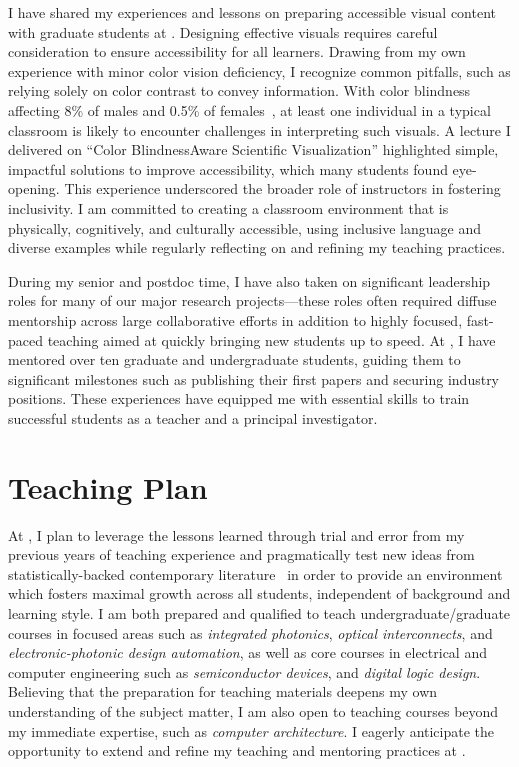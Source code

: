 I have shared my experiences and lessons on preparing accessible visual content with graduate students at \mySchoolShort{}. Designing effective visuals requires careful consideration to ensure accessibility for all learners. Drawing from my own experience with minor color vision deficiency, I recognize common pitfalls, such as relying solely on color contrast to convey information. With color blindness affecting 8\% of males and 0.5\% of females~\cite{TypesColourBlindness}, at least one individual in a typical classroom is likely to encounter challenges in interpreting such visuals. A lecture I delivered on “Color Blindness\textendash{}Aware Scientific Visualization” highlighted simple, impactful solutions to improve accessibility, which many students found eye-opening. This experience underscored the broader role of instructors in fostering inclusivity. I am committed to creating a classroom environment that is physically, cognitively, and culturally accessible, using inclusive language and diverse examples while regularly reflecting on and refining my teaching practices.

During my senior \myDegree{} and postdoc time, I have also taken on significant leadership roles for many of our major research projects—these roles often required diffuse mentorship across large collaborative efforts in addition to highly focused, fast-paced teaching aimed at quickly bringing new students up to speed. At \mySchoolShort{}, I have mentored over ten graduate and undergraduate students, guiding them to significant milestones such as publishing their first papers and securing industry positions. These experiences have equipped me with essential skills to train successful students as a teacher and a principal investigator.

\section*{Teaching Plan}

At \appSchoolShort{}, I plan to leverage the lessons learned through trial and error from my previous years of teaching experience and pragmatically test new ideas from statistically-backed contemporary literature~\cite{deslauriersMeasuringActualLearning2019,bathgatePerceivedSupportsEvidencebased2019} in order to provide an environment which fosters maximal growth across all students, independent of background and learning style. I am both prepared and qualified to teach undergraduate/graduate courses in focused areas such as \emph{integrated photonics}, \emph{optical interconnects}, and \emph{electronic-photonic design automation}, as well as core courses in electrical and computer engineering such as \emph{semiconductor devices}, and \emph{digital logic design}. Believing that the preparation for teaching materials deepens my own understanding of the subject matter, I am also open to teaching courses beyond my immediate expertise, such as \emph{computer architecture}. I eagerly anticipate the opportunity to extend and refine my teaching and mentoring practices at \appSchoolDeptShort{}.
